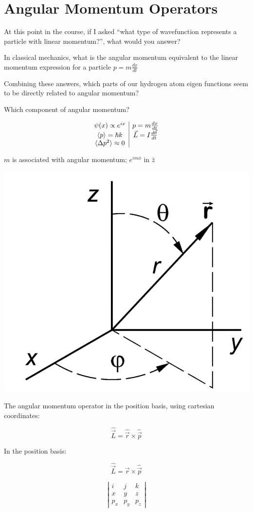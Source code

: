 \documentclass{article}
\begin{document}
\section{Angular Momentum Operators}

At this point in the course, if I asked “what type of wavefunction represents a particle with linear momentum?”, what would you answer?



In classical mechanics, what is the angular momentum equivalent to the linear momentum expression for a particle $p = m \frac{dx}{dt}$



Combining these answers, which parts of our hydrogen atom eigen functions seem to be directly related to angular momentum?



Which component of angular momentum?



$$\begin{array}{c | c}
    \psi(x) \propto e^{ix} &  p = m \frac{dx}{dt}\\
     \braket{p} = \hbar k & \vec{L} = I \frac{d \vec{\theta}}{dt} \\
     \braket{\Delta p^2} \approx 0
\end{array}$$

$m$ is associated with angular momentum; $e^{i m \phi} \text{ in } \hat{z}$

\includegraphics[width = 0.345 \textwidth]{Lecture21/10.png}



The angular momentum operator in the position basis, using cartesian coordinates:

$$\hat{\vec{L}} = \hat{\vec{r}} \times \hat{\vec{p}}$$

In the position basis:

$$\hat{\vec{L}}  = \vec{r} \times \hat{\vec{p}}$$

$$\left| \begin{matrix} i & j & k \\ x & y & z \\ p_x & p_y & p_z \end{matrix} \right|$$
\end{document}
